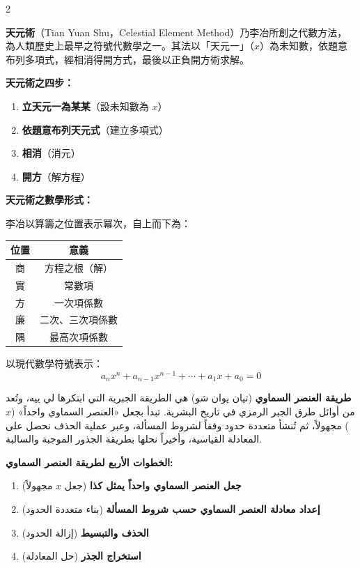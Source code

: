 \documentclass[11pt,a4paper]{article}
\newcommand{\ar}[1]{\arabicfont\beginR #1\endR}
\newcommand{\arnote}[1]{\textcolor{arabicblue}{\ar{#1}}}
\begin{document}
\begin{paracol}{2}

\begin{leftcolumn*}
\begin{framed}
\noindent\textbf{天元術}（Tian Yuan Shu，Celestial Element Method）乃李冶所創之代數方法，為人類歷史上最早之符號代數學之一。其法以「天元一」（$x$）為未知數，依題意布列多項式，經相消得開方式，最後以正負開方術求解。
\end{framed}

\textbf{天元術之四步：}
\begin{enumerate}[leftmargin=1.5em,topsep=0pt]
  \item \textbf{立天元一為某某}（設未知數為 $x$）
  \item \textbf{依題意布列天元式}（建立多項式）
  \item \textbf{相消}（消元）
  \item \textbf{開方}（解方程）
\end{enumerate}

\textbf{天元術之數學形式：}

李冶以算籌之位置表示冪次，自上而下為：
\begin{center}
\begin{tabular}{c|c}
\textbf{位置} & \textbf{意義} \\
\hline
商 & 方程之根（解） \\
實 & 常數項 \\
方 & 一次項係數 \\
廉 & 二次、三次項係數 \\
隅 & 最高次項係數 \\
\hline
\end{tabular}
\end{center}

以現代數學符號表示：
$$a_n x^n + a_{n-1} x^{n-1} + \cdots + a_1 x + a_0 = 0$$
\end{leftcolumn*}

\begin{rightcolumn}
\begin{framed}
\arnote{\textbf{طريقة العنصر السماوي} (تيان يوان شو) هي الطريقة الجبرية التي ابتكرها لي ييه، وتُعد من أوائل طرق الجبر الرمزي في تاريخ البشرية. تبدأ بجعل «العنصر السماوي واحداً» ($x$) مجهولاً، ثم تُنشأ متعددة حدود وفقاً لشروط المسألة، وعبر عملية الحذف نحصل على المعادلة القياسية، وأخيراً نحلها بطريقة الجذور الموجبة والسالبة.}
\end{framed}

\arnote{\textbf{الخطوات الأربع لطريقة العنصر السماوي:}}
\begin{enumerate}[leftmargin=1.5em,topsep=0pt]
  \item \arnote{\textbf{جعل العنصر السماوي واحداً يمثل كذا} (جعل $x$ مجهولاً)}
  \item \arnote{\textbf{إعداد معادلة العنصر السماوي حسب شروط المسألة} (بناء متعددة الحدود)}
  \item \arnote{\textbf{الحذف والتبسيط} (إزالة الحدود)}
  \item \arnote{\textbf{استخراج الجذر} (حل المعادلة)}
\end{enumerate}


\end{rightcolumn}
\end{paracol}
\end{document}
